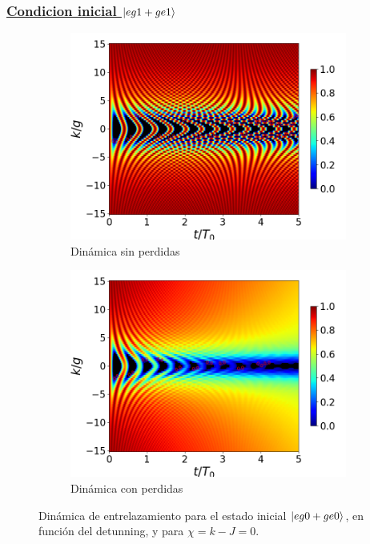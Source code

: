 \subsubsection{\underline{Condicion inicial $\ket{eg1+ge1}$}}
\begin{figure}[h]
    \centering
    \begin{subfigure}{0.49\textwidth}
        \includegraphics[width=\textwidth]{figuras/ch4/concu/k/eg1+ge1 d=0.0g x=0.0g J=15.0g gamma=0.25g concu k uni.png}
        \caption{Dinámica sin perdidas}
        \label{fig4:concu k 1 uni}
    \end{subfigure}
    \hfill
    \begin{subfigure}{0.49\textwidth}
        \includegraphics[width=\textwidth]{figuras/ch4/concu/k/eg1+ge1 d=0.0g x=0.0g J=15.0g gamma=0.25g concu k dis.png}
        \caption{Dinámica con perdidas}
        \label{fig4:concu k 1 dis}
    \end{subfigure}
    \caption{Dinámica de entrelazamiento para el estado inicial $\ket{eg0+ge0}$, en función del detunning, y para $\chi=k-J=0$.}
    \label{fig4:concu k 1}
\end{figure}
